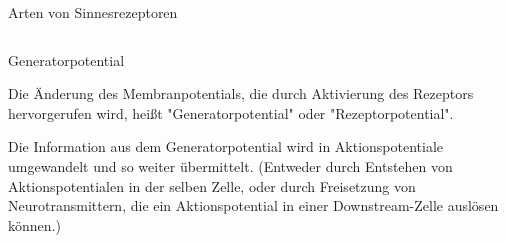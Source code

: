 \documentclass{beamer}
\begin{document}
\begin{frame}{Arten von Sinnesrezeptoren}
\begin{columns}[c]
\begin{column}{5cm}
\begin{center}
\end{center}


\end{column}


\end{columns}

\end{frame}





\begin{frame}{Generatorpotential}

Die Änderung des Membranpotentials, die durch Aktivierung des Rezeptors hervorgerufen wird, heißt "Generatorpotential" oder "Rezeptorpotential". 

Die Information aus dem Generatorpotential wird in Aktionspotentiale umgewandelt und so weiter übermittelt. (Entweder durch Entstehen von Aktionspotentialen in der selben Zelle, oder durch Freisetzung von Neurotransmittern, die ein Aktionspotential in einer Downstream-Zelle auslösen können.) 


\end{frame}


\end{document}
